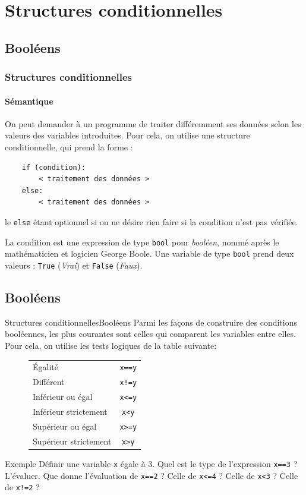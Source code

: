 \documentclass[10pt]{beamer}
\begin{document}
\section{Structures conditionnelles}

\subsection{Booléens}

\begin{frame}[fragile]
	\frametitle{Structures conditionnelles}
	\framesubtitle{Sémantique}
	On peut demander à un programme de traiter différemment ses données selon les valeurs des variables introduites. Pour cela, on utilise une structure conditionnelle, qui prend la forme :
	\begin{lstlisting}
	if (condition):
		< traitement des données >
	else:
		< traitement des données >
    \end{lstlisting}
    le \verb|else| étant optionnel si on ne désire rien faire si la condition n'est pas vérifiée.
    \pause
    
    La condition est une expression de type \verb|bool| pour \textit{booléen}, nommé après le mathématicien et logicien George Boole. Une variable de type \verb|bool| prend deux valeurs : \verb|True| (\textit{Vrai}) et \verb|False| (\textit{Faux}).
\end{frame}

\subsection{Booléens}

\begin{frame}[fragile]{Structures conditionnelles}{Booléens}
	Parmi les façons de construire des conditions booléennes, les plus courantes sont celles qui comparent les variables entre elles. Pour cela, on utilise les tests logiques de la table suivante:\pause
	\begin{figure}
	\centering
	\begin{tabular}{|l|c|}\hline
	Égalité & \verb|x==y| \\ 
	Différent & \verb|x!=y| \\ 
	Inférieur ou égal & \verb|x<=y| \\ 
	Inférieur strictement & \verb|x<y| \\ 
	Supérieur ou égal & \verb|x>=y| \\
	Supérieur strictement & \verb|x>y| \\ \hline
	\end{tabular}
	\end{figure}
	\pause
	
	\begin{block}{Exemple}
	Définir une variable \verb|x| égale à $3$. Quel est le type de l'expression \verb|x==3| ? L'évaluer. Que donne l'évaluation de \verb|x==2| ? Celle de \verb|x<=4| ? Celle de \verb|x<3| ? Celle de \verb|x!=2| ?
	\end{block}
\end{frame}
\end{document}
